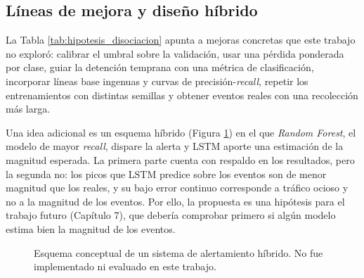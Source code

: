 \documentclass[12pt]{report}
\begin{document}
\subsection*{Líneas de mejora y diseño híbrido}

La Tabla \ref{tab:hipotesis_disociacion} apunta a mejoras concretas que este trabajo no exploró: calibrar el umbral sobre la validación, usar una pérdida ponderada por clase, guiar la detención temprana con una métrica de clasificación, incorporar líneas base ingenuas y curvas de precisión-\textit{recall}, repetir los entrenamientos con distintas semillas y obtener eventos reales con una recolección más larga.

Una idea adicional es un esquema híbrido (Figura \ref{fig:esquema_hibrido}) en el que \textit{Random Forest}, el modelo de mayor \textit{recall}, dispare la alerta y LSTM aporte una estimación de la magnitud esperada. La primera parte cuenta con respaldo en los resultados, pero la segunda no: los picos que LSTM predice sobre los eventos son de menor magnitud que los reales, y su bajo error continuo corresponde a tráfico ocioso y no a la magnitud de los eventos. Por ello, la propuesta es una hipótesis para el trabajo futuro (Capítulo 7), que debería comprobar primero si algún modelo estima bien la magnitud de los eventos.

\begin{figure}[H]
    \centering
    \caption{Esquema conceptual de un sistema de alertamiento híbrido. No fue implementado ni evaluado en este trabajo.}
    \label{fig:esquema_hibrido}
\end{figure}
\end{document}
